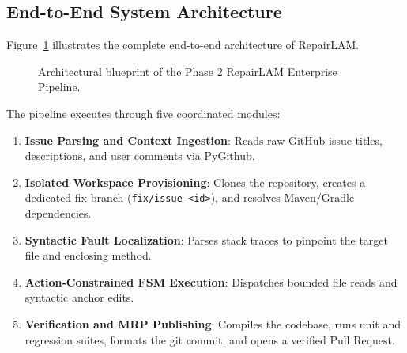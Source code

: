 \documentclass[12pt,a4paper]{report}
\begin{document}
\subsection{End-to-End System Architecture}
Figure~\ref{fig:repairlam_pipeline} illustrates the complete end-to-end architecture of RepairLAM.

\begin{figure}[htbp]
\centering
{}
\caption{Architectural blueprint of the Phase 2 RepairLAM Enterprise Pipeline.}
\label{fig:repairlam_pipeline}
\end{figure}

The pipeline executes through five coordinated modules:
\begin{enumerate}
    \item \textbf{Issue Parsing and Context Ingestion}: Reads raw GitHub issue titles, descriptions, and user comments via PyGithub.
    \item \textbf{Isolated Workspace Provisioning}: Clones the repository, creates a dedicated fix branch (\texttt{fix/issue-<id>}), and resolves Maven/Gradle dependencies.
    \item \textbf{Syntactic Fault Localization}: Parses stack traces to pinpoint the target file and enclosing method.
    \item \textbf{Action-Constrained FSM Execution}: Dispatches bounded file reads and syntactic anchor edits.
    \item \textbf{Verification and MRP Publishing}: Compiles the codebase, runs unit and regression suites, formats the git commit, and opens a verified Pull Request.
\end{enumerate}
\end{document}
